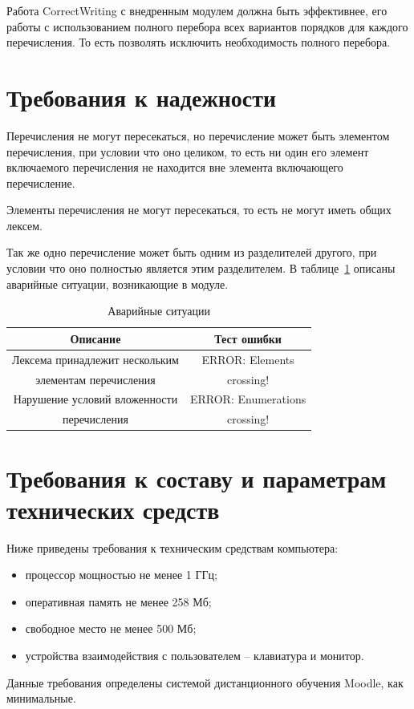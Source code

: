 \documentclass[a4paper,english]{G2-105}
\begin{document}
\par Работа CorrectWriting с внедренным модулем должна быть эффективнее, его работы с использованием полного перебора всех вариантов порядков для каждого перечисления. 
То есть позволять исключить необходимость полного перебора.

\section{Требования к надежности}

\par Перечисления не могут пересекаться, но перечисление может быть элементом перечисления,
при условии что оно целиком, то есть ни один его элемент включаемого перечисления не находится вне элемента включающего перечисление. 
\par Элементы перечисления не могут пересекаться, то есть не могут иметь общих лексем.
\par Так же одно перечисление может быть одним из разделителей другого, при условии что
оно полностью является этим разделителем.
В таблице~\ref{errors} описаны аварийные ситуации, возникающие в модуле.
\begin{longtable}{|c|c|}
    \caption{Аварийные ситуации} \label{errors} \\ \hline
    Описание & Тест ошибки \\ \hline \endhead
    Лексема принадлежит нескольким & ERROR: Elements \\ 
    элементам перечисления         & crossing! \\ \hline
    Нарушение условий вложенности  & ERROR: Enumerations \\ 
    перечисления                   & crossing! \\
\end{longtable}

\section{Требования к составу и параметрам технических средств}

\par Ниже приведены требования к техническим средствам компьютера:
\begin{itemize}
\item процессор мощностью не менее 1 ГГц;
\item оперативная память не менее 258 Мб;
\item свободное место не менее 500 Мб;
\item устройства взаимодействия с пользователем – клавиатура и монитор.
\end{itemize}
\par Данные требования определены системой дистанционного обучения Moodle, как минимальные.
\end{document}
